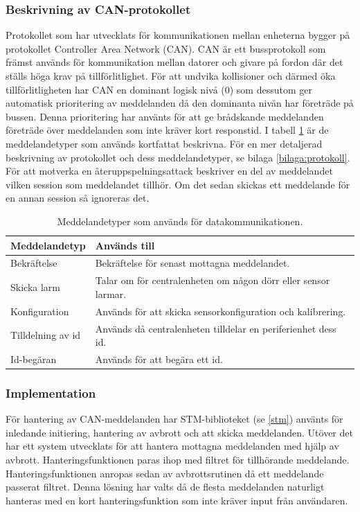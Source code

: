 \documentclass{article}
\begin{document}
\subsubsection{Beskrivning av CAN-protokollet}
Protokollet som har utvecklats för kommunikationen mellan enheterna bygger på protokollet Controller Area Network (CAN).
CAN är ett bussprotokoll som främst används för kommunikation mellan datorer och givare på fordon där det ställs höga krav på tillförlitlighet.
För att undvika kollisioner och därmed öka tillförlitligheten har CAN en dominant logisk nivå (0) som dessutom ger automatisk prioritering av meddelanden då den dominanta nivån har företräde på bussen.
Denna prioritering har använts för att ge brådskande meddelanden företräde över meddelanden som inte kräver kort responstid. I tabell \ref{tab:meddelandetyper} är de meddelandetyper som används kortfattat beskrivna. För en mer detaljerad beskrivning av protokollet och dess meddelandetyper, se bilaga \ref{bilaga:protokoll}. För att motverka en återuppspelningsattack beskriver en del av meddelandet vilken session som meddelandet tillhör. Om det sedan skickas ett meddelande för en annan session så ignoreras det.



\begin{table}[H]
	\centering
    \begin{tabular}{|l|p{}|}

		\hline
		Meddelandetyp & Används till \\ \hline \hline
		Bekräftelse		& Bekräftelse för senast mottagna meddelandet. \\ \hline
		Skicka larm		& Talar om för centralenheten om någon dörr eller sensor larmar. \\ \hline
		Konfiguration		& Används för att skicka sensorkonfiguration och kalibrering. \\ \hline
		Tilldelning av id		& Används då centralenheten tilldelar en periferienhet dess id. \\ \hline
		Id-begäran		& Används för att begära ett id. \\ \hline

	\end{tabular}
	\caption{Meddelandetyper som används för datakommunikationen.}
	\label{tab:meddelandetyper}
\end{table}


\subsubsection{Implementation}
För hantering av CAN-meddelanden har STM-biblioteket (se \ref{stm}) använts för inledande initiering,
hantering av avbrott och att skicka meddelanden.
Utöver det har ett system utvecklats för att hantera mottagna meddelanden med hjälp av avbrott.
Hanteringsfunktionen paras ihop med filtret för tillhörande meddelande.
Hanteringsfunktionen anropas sedan av avbrottsrutinen då ett meddelande passerat filtret.
Denna lösning har valts då de flesta meddelanden naturligt hanteras med en kort hanteringsfunktion
som inte kräver input från användaren.
\end{document}
